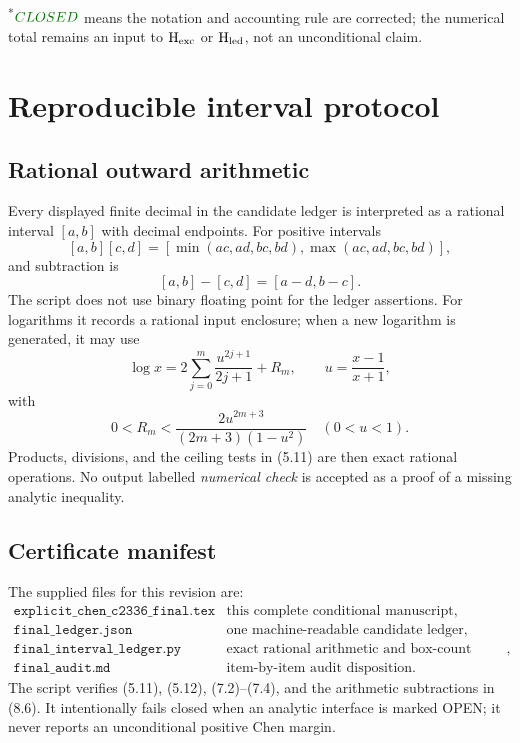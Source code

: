 \documentclass[11pt]{article}
\theoremstyle{definition}
\newcommand{\openstatus}{\textcolor{red!75!black}{OPEN}}
\newcommand{\closedstatus}{\textcolor{green!45!black}{CLOSED}}
\newcommand{\cert}[1]{\texttt{#1}}
\begin{document}
\noindent\textsuperscript{*}\(\closedstatus\) means the notation and
accounting rule are corrected; the numerical total remains an input to
\(\mathrm{H}_{\rm exc}\) or \(\mathrm{H}_{\rm led}\), not an unconditional
claim.

\section{Reproducible interval protocol}
\label{sec:protocol}

\subsection{Rational outward arithmetic}
\label{sec:interval}

Every displayed finite decimal in the candidate ledger is interpreted as a
rational interval \([a,b]\) with decimal endpoints.  For positive intervals
\[
 [a,b][c,d]=[\min(ac,ad,bc,bd),\max(ac,ad,bc,bd)],
\]
and subtraction is
\[
 [a,b]-[c,d]=[a-d,b-c].
\]
The script does not use binary floating point for the ledger assertions.
For logarithms it records a rational input enclosure; when a new logarithm
is generated, it may use
\[
 \log x=2\sum_{j=0}^{m}\frac{u^{2j+1}}{2j+1}+R_m,\qquad
 u=\frac{x-1}{x+1},
\]
with
\[
 0<R_m<
 \frac{2u^{2m+3}}{(2m+3)(1-u^2)}
\quad(0<u<1).
\tag{11.1}
\]
Products, divisions, and the ceiling tests in (5.11) are then exact
rational operations.  No output labelled \textit{numerical check} is
accepted as a proof of a missing analytic inequality.

\subsection{Certificate manifest}
\label{sec:manifest}

The supplied files for this revision are:
\[
\begin{array}{ll}
\cert{explicit\_chen\_c2336\_final.tex}&
\text{this complete conditional manuscript},\\
\cert{final\_ledger.json}&
\text{one machine-readable candidate ledger},\\
\cert{final\_interval\_ledger.py}&
\text{exact rational arithmetic and box-count checks},\\
\cert{final\_audit.md}&
\text{item-by-item audit disposition}.
\end{array}
\tag{11.2}
\]
The script verifies (5.11), (5.12), (7.2)--(7.4), and the arithmetic
subtractions in (8.6).  It intentionally fails closed when an analytic
interface is marked \openstatus; it never reports an unconditional
positive Chen margin.
\end{document}
